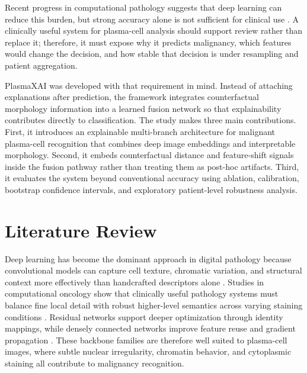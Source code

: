 \documentclass[runningheads]{llncs}
\begin{document}
Recent progress in computational pathology suggests that deep learning can reduce this burden, but strong accuracy alone is not sufficient for clinical use \cite{litjens,bera,campanella}. A clinically useful system for plasma-cell analysis should support review rather than replace it; therefore, it must expose why it predicts malignancy, which features would change the decision, and how stable that decision is under resampling and patient aggregation.

PlasmaXAI was developed with that requirement in mind. Instead of attaching explanations after prediction, the framework integrates counterfactual morphology information into a learned fusion network so that explainability contributes directly to classification. The study makes three main contributions. First, it introduces an explainable multi-branch architecture for malignant plasma-cell recognition that combines deep image embeddings and interpretable morphology. Second, it embeds counterfactual distance and feature-shift signals inside the fusion pathway rather than treating them as post-hoc artifacts. Third, it evaluates the system beyond conventional accuracy using ablation, calibration, bootstrap confidence intervals, and exploratory patient-level robustness analysis.

\section{Literature Review}
Deep learning has become the dominant approach in digital pathology because convolutional models can capture cell texture, chromatic variation, and structural context more effectively than handcrafted descriptors alone \cite{litjens,janowczyk}. Studies in computational oncology show that clinically useful pathology systems must balance fine local detail with robust higher-level semantics across varying staining conditions \cite{bera,campanella}. Residual networks support deeper optimization through identity mappings, while densely connected networks improve feature reuse and gradient propagation \cite{resnet,densenet}. These backbone families are therefore well suited to plasma-cell images, where subtle nuclear irregularity, chromatin behavior, and cytoplasmic staining all contribute to malignancy recognition.
\end{document}
